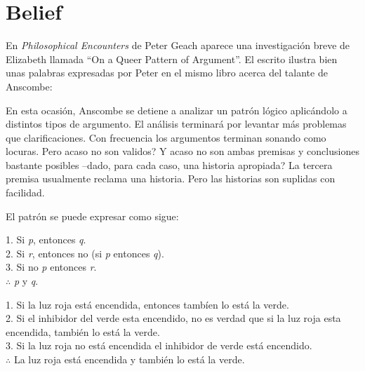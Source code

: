 \section{Belief}

En \emph{Philosophical Encounters} de Peter Geach aparece una investigación
breve de Elizabeth llamada ``On a Queer Pattern of Argument''. El escrito
ilustra bien unas palabras expresadas por Peter en el mismo libro acerca del
talante de Anscombe: 

En esta ocasión, Anscombe se detiene a analizar un patrón lógico aplicándolo a
distintos tipos de argumento. El análisis terminará por levantar más problemas
que clarificaciones. Con frecuencia los argumentos terminan sonando como
locuras. Pero acaso no son validos? Y acaso no son ambas premisas y conclusiones
bastante posibles --dado, para cada caso, una historia apropiada?
La tercera premisa usualmente reclama una historia. Pero las historias son
suplidas con facilidad.

El patrón se puede expresar como sigue:
\begin{adjustwidth}{1.2cm}{}
  1. Si \emph{p}, entonces \emph{q}.\\
  2. Si \emph{r}, entonces no (si \emph{p} entonces \emph{q}).\\
  3. Si no \emph{p} entonces \emph{r}.\\
  $\therefore$ \emph{p} y \emph{q}.
\end{adjustwidth}

\begin{adjustwidth}{1.2cm}{}
  1. Si la luz roja está encendida, entonces tambíen lo está la verde.\\
  2. Si el inhibidor del verde esta encendido, no es verdad que si la luz roja
  esta encendida, también lo está la verde.\\
  3. Si la luz roja no está encendida el inhibidor de verde está encendido.\\
  $\therefore$ La luz roja está encendida y también lo está la verde.
\end{adjustwidth}

